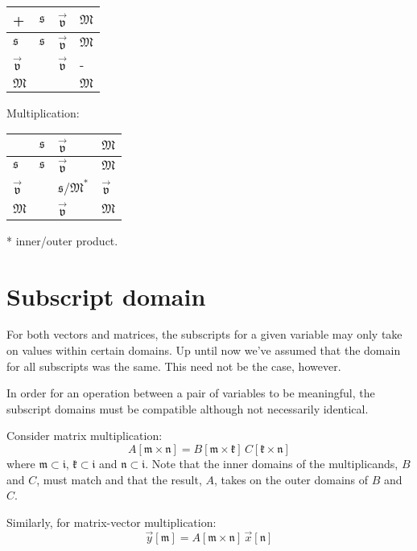 \documentclass{article}
\newcommand{\subclass}{\mathfrak{i}}
\newcommand{\scalarclass}{\mathfrak{s}}
\newcommand{\vectorclass}{\vec{\mathfrak{v}}}
\newcommand{\matrixclass}{\mathfrak{M}}
\newcommand{\domain}[1]{\mathfrak{#1}}
\begin{document}
\begin{tabular}{|l|lll|}\hline
	+ & $\scalarclass$ & $\vectorclass$ & $\matrixclass$ \\ \hline
	$\scalarclass$ & $\scalarclass$ & $\vectorclass$ & $\matrixclass$ \\
	$\vectorclass$ & & $\vectorclass$ & - \\
	$\matrixclass$ & & & $\matrixclass$ \\\hline
\end{tabular}

Multiplication:

\begin{tabular}{|l|lll|}\hline
	& $\scalarclass$ & $\vectorclass$ & $\matrixclass$ \\ \hline
	$\scalarclass$ & $\scalarclass$ & $\vectorclass$ & $\matrixclass$ \\
	$\vectorclass$ & & $\scalarclass$/$\matrixclass^*$ & $\vectorclass$ \\
	$\matrixclass$ & & $\vectorclass$ & $\matrixclass$ \\\hline
\end{tabular}

* inner/outer product.

\section{Subscript domain}

For both vectors and matrices, the subscripts for a given variable may only
take on values within certain domains.
Up until now we've assumed that the domain for all subscripts was the same.
This need not be the case, however.

In order for an operation between a pair of variables to be meaningful,
the subscript domains must be compatible although not necessarily identical.

Consider matrix multiplication:
\begin{equation}
	A [\domain{m} \times \domain{n}] = B[\domain{m} \times \domain{k}] \, C [\domain{k} \times \domain{n}]
\end{equation}
where $\domain{m} \subset \subclass$, 
$\domain{k} \subset \subclass$
and $\domain{n} \subset \subclass$.
Note that the inner domains of the multiplicands, $B$ and $C$, must match 
and that the result, $A$, takes on the outer domains of $B$ and $C$.

Similarly, for matrix-vector multiplication:
\begin{equation}
	\vec y [\domain{m}] = A [\domain{m} \times \domain{n}] \, \vec x [\domain{n}]
\end{equation}
\end{document}
